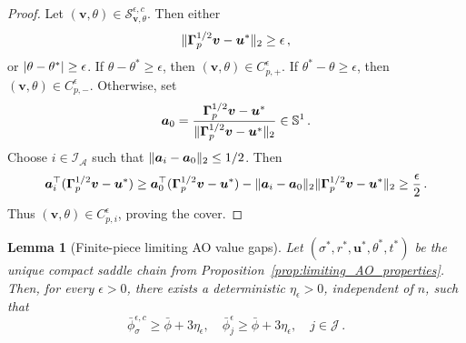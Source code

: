 \documentclass{article}
\makeatletter
\newtheorem{lemma}{Lemma}
\theoremstyle{definition}
\newcommand{\vnorm}[1]{%
	\ensuremath{%
		\if@display
		\left\| #1 \right\|
		\else
		\| #1 \|
		\fi
	}%
}
\newcommand{\abs}[1]{%
	\ensuremath{%
		\if@display
		\left| #1 \right|
		\else
		\lvert #1 \rvert
		\fi
	}%
}
\newcommand*{\bb}{\boldsymbol}
\def\bu{\bb{u}}
\def\bv{\bb{v}}
\makeatother
\begin{document}
\begin{bibunit}
\begin{proof}
Let $(\bv,\theta)\in\mathcal S_{\bv,\theta}^{\epsilon,c}$. Then either
$$
    \vnorm{\bb\Gamma_p^{1/2}\bv-\bu^*}_2\geq\epsilon\,,
$$
or $\abs{\theta-\theta^*}\geq\epsilon$. If
$\theta-\theta^*\geq\epsilon$, then
$(\bv,\theta)\in C_{p,+}^{\epsilon}$. If
$\theta^*-\theta\geq\epsilon$, then
$(\bv,\theta)\in C_{p,-}^{\epsilon}$. Otherwise, set
$$
    \bb a_0
    =
    \frac{\bb\Gamma_p^{1/2}\bv-\bu^*}
    {\vnorm{\bb\Gamma_p^{1/2}\bv-\bu^*}_2}
    \in\mathbb S^1 \,.
$$
Choose $i\in\mathcal I_{\mathcal A}$ such that
$\vnorm{\bb a_i-\bb a_0}_2\leq1/2$. Then
$$
\begin{aligned}
    \bb a_i^\top
    (\bb\Gamma_p^{1/2}\bv-\bu^*)
    \geq
    \bb a_0^\top
    (\bb\Gamma_p^{1/2}\bv-\bu^*)
    -
    \vnorm{\bb a_i-\bb a_0}_2
    \vnorm{\bb\Gamma_p^{1/2}\bv-\bu^*}_2
    \geq
    \frac{\epsilon}{2} \,.
\end{aligned}
$$
Thus $(\bv,\theta)\in C_{p,i}^{\epsilon}$, proving the cover.
\end{proof}


\begin{lemma}[Finite-piece limiting AO value gaps]
\label{lemma:limiting_AO_gap}
Let $(\sigma^*,r^*,\bu^*,\theta^*,t^*)$ be the unique compact saddle
chain from Proposition~\ref{prop:limiting_AO_properties}. Then, for every
$\epsilon>0$, there exists a deterministic $\eta_\epsilon>0$, independent
of $n$, such that
$$
    \bar\phi_{\sigma}^{\epsilon,c}\ge\bar\phi+3\eta_\epsilon,
    \quad
    \bar\phi_j^\epsilon\ge\bar\phi+3\eta_\epsilon,
    \quad j\in\mathcal J\,.
$$
\end{lemma}


\end{bibunit}
\end{document}
